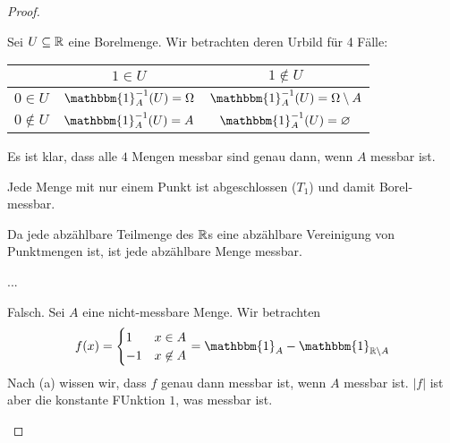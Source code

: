 \begin{proof}
	\begin{parts}
		\item Sei $U\subseteq \mathbb{R}$ eine Borelmenge. Wir betrachten deren Urbild f\"{u}r 4 F\"{a}lle:
		
		\begin{tabular}{|c|c|c|}
			\hline
			& $1\in U$ & $1\not\in U$\\\hline
			$0\in U$ & $\mathbbm{1}_A^{-1}(U)=\Omega$ & $\mathbbm{1}_A^{-1}(U)=\Omega \setminus A$\\\hline
			$0\not\in U$ & $\mathbbm{1}_A^{-1}(U)=A$ & $\mathbbm{1}_A^{-1}(U)=\varnothing$\\\hline
		\end{tabular}
		
		Es ist klar, dass alle $4$ Mengen messbar sind genau dann, wenn $A$ messbar ist.
		\item Jede Menge mit nur einem Punkt ist abgeschlossen ($T_1$) und damit Borel-messbar. 
		
		Da jede abzählbare Teilmenge des $\mathbb{R}$s eine abzählbare Vereinigung von Punktmengen ist, ist jede abzählbare Menge messbar.
		\item ...
		\item Falsch. Sei $A$ eine nicht-messbare Menge. Wir betrachten
		\[f(x)=\begin{cases}
			1 & x\in A\\
			-1 & x\not\in A
		\end{cases}=\mathbbm{1}_A- \mathbbm{1}_{\R\setminus A}\]
		Nach (a) wissen wir, dass $f$ genau dann messbar ist, wenn $A$ messbar ist. $|f|$ ist aber die konstante FUnktion $1$, was messbar ist.
	\end{parts}
\end{proof}